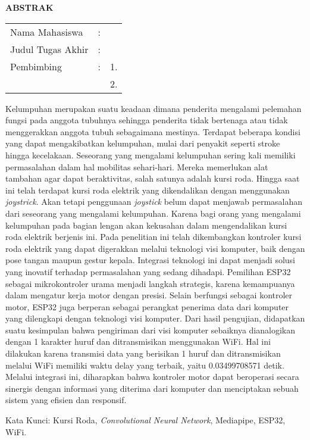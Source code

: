 \begin{center}
  \large\textbf{ABSTRAK}
\end{center}


\vspace{2ex}

\begingroup
\setlength{\tabcolsep}{0pt}

\noindent
\begin{tabularx}{\textwidth}{l >{\centering}m{2em} X}
  Nama Mahasiswa    & : & \name{}         \\

  Judul Tugas Akhir & : & \tatitle{}      \\

  Pembimbing        & : & 1. \advisor{}   \\
                    &   & 2. \coadvisor{} \\
\end{tabularx}
\endgroup

Kelumpuhan merupakan suatu keadaan dimana penderita mengalami pelemahan fungsi pada anggota tubuhnya sehingga penderita tidak bertenaga atau tidak menggerakkan anggota tubuh sebagaimana mestinya. Terdapat beberapa kondisi yang dapat mengakibatkan kelumpuhan, mulai dari penyakit seperti stroke hingga kecelakaan. Seseorang yang mengalami kelumpuhan sering kali memiliki permasalahan dalam hal mobilitas sehari-hari. Mereka memerlukan alat tambahan agar dapat beraktivitas, salah satunya adalah kursi roda. Hingga saat ini telah terdapat kursi roda elektrik yang dikendalikan dengan menggunakan \emph{joystrick}. Akan tetapi penggunaan \emph{joystick} belum dapat menjawab permasalahan dari seseorang yang mengalami kelumpuhan. Karena bagi orang yang mengalami kelumpuhan pada bagian lengan akan kekusahan dalam mengendalikan kursi roda elektrik berjenis ini. Pada penelitian ini telah dikembangkan kontroler kursi roda elektrik yang dapat digerakkan melalui teknologi visi komputer, baik dengan pose tangan maupun gestur kepala. Integrasi teknologi ini dapat menjadi solusi yang inovatif terhadap permasalahan yang sedang dihadapi. Pemilihan ESP32 sebagai mikrokontroler urama menjadi langkah strategis, karena kemampuanya dalam mengatur kerja motor dengan presisi. Selain berfungsi sebagai kontroler motor, ESP32 juga berperan sebagai perangkat penerima data dari komputer yang dilengkapi dengan teknologi visi komputer. Dari hasil pengujian, didapatkan suatu kesimpulan bahwa pengiriman dari visi komputer sebaiknya dianalogikan dengan 1 karakter huruf dan ditransmisikan menggunakan WiFi. Hal ini dilakukan karena transmisi data yang berisikan 1 huruf dan ditransmisikan melalui WiFi memiliki waktu delay yang terbaik, yaitu 0.03499708571 detik. Melalui integrasi ini, diharapkan bahwa kontroler motor dapat beroperasi secara sinergis dengan informasi yang diterima dari komputer dan menciptakan sebuah sistem yang efisien dan responsif.

Kata Kunci: Kursi Roda, \emph{Convolutional Neural Network}, Mediapipe, ESP32, WiFi.
